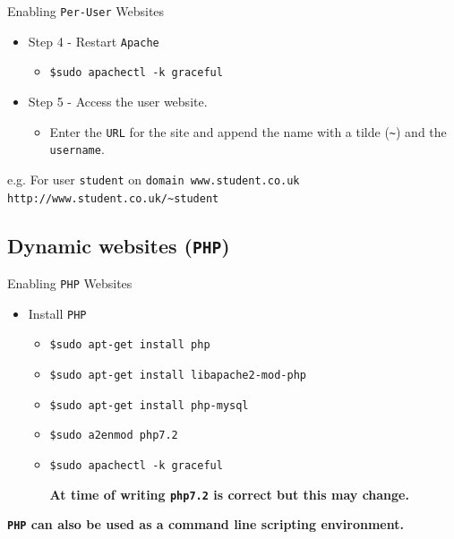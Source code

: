 \documentclass[xcolor=table,aspectratio=169]{beamer}
\begin{document}
\begin{frame}{Enabling \texttt{Per-User} Websites}
  \begin{itemize}
     \item Step 4 - Restart \texttt{Apache}
       \begin{itemize}
         \item \texttt{\$sudo apachectl -k graceful}
       \end{itemize}
     \item  Step 5 - Access the user website.
       \begin{itemize}
         \item Enter the \texttt{URL} for the site and append the name with a tilde (\texttt{\textasciitilde}) and the \texttt{username}. 
       \end{itemize}
   \end{itemize}
   \begin{tcolorbox}
    \begin{center}
      \scriptsize e.g. For user \texttt{student} on \texttt{domain www.student.co.uk}\\\texttt{http://www.student.co.uk/\textasciitilde student}
    \end{center}
  \end{tcolorbox}
\end{frame}

\subsection{Dynamic websites (\texttt{PHP})}
\begin{frame}{Enabling \texttt{PHP} Websites}
   \begin{itemize}
      \item Install \texttt{PHP}
        \begin{itemize}
          \item \texttt{\$sudo apt-get install php}
          \item \texttt{\$sudo apt-get install libapache2-mod-php}
          \item \texttt{\$sudo apt-get install php-mysql}
          \item \texttt{\$sudo a2enmod php7.2}
          \item \texttt{\$sudo apachectl -k graceful}
            \begin{tcolorbox}
              \begin{center}
                 \scriptsize \textbf{At time of writing \texttt{php7.2} is correct but this may change.}
              \end{center}
            \end{tcolorbox}
        \end{itemize}
    \end{itemize}
    \begin{tcolorbox}
      \begin{center}
        \scriptsize \textbf{\texttt{PHP} can also be used as a command line scripting environment.}
      \end{center}
    \end{tcolorbox}
\end{frame}
\end{document}
